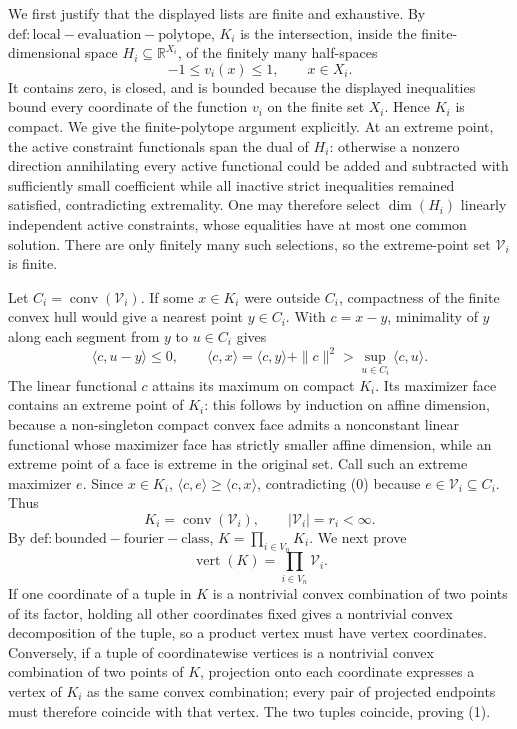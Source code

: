 We first justify that the displayed lists are finite and exhaustive.  By \(\mathrm{def:local-evaluation-polytope}\), \(K_i\) is the intersection, inside the finite-dimensional space \(H_i\subseteq\mathbb R^{X_i}\), of the finitely many half-spaces
\[
 -1\le v_i(x)\le1,
 \qquad x\in X_i.
\]
It contains zero, is closed, and is bounded because the displayed inequalities bound every coordinate of the function \(v_i\) on the finite set \(X_i\).  Hence \(K_i\) is compact.  We give the finite-polytope argument explicitly.  At an extreme point, the active constraint functionals span the dual of \(H_i\): otherwise a nonzero direction annihilating every active functional could be added and subtracted with sufficiently small coefficient while all inactive strict inequalities remained satisfied, contradicting extremality.  One may therefore select \(\dim(H_i)\) linearly independent active constraints, whose equalities have at most one common solution.  There are only finitely many such selections, so the extreme-point set \(\mathcal V_i\) is finite.

Let \(C_i=\operatorname{conv}(\mathcal V_i)\).  If some \(x\in K_i\) were outside \(C_i\), compactness of the finite convex hull would give a nearest point \(y\in C_i\).  With \(c=x-y\), minimality of \(y\) along each segment from \(y\) to \(u\in C_i\) gives
\[
 \langle c,u-y\rangle\le0,
 \qquad
 \langle c,x\rangle=\langle c,y\rangle+\|c\|^2
 >\sup_{u\in C_i}\langle c,u\rangle. \tag{0}
\]
The linear functional \(c\) attains its maximum on compact \(K_i\).  Its maximizer face contains an extreme point of \(K_i\): this follows by induction on affine dimension, because a non-singleton compact convex face admits a nonconstant linear functional whose maximizer face has strictly smaller affine dimension, while an extreme point of a face is extreme in the original set.  Call such an extreme maximizer \(e\).  Since \(x\in K_i\), \(\langle c,e\rangle\ge\langle c,x\rangle\), contradicting (0) because \(e\in\mathcal V_i\subseteq C_i\).  Thus
\[
 K_i=\operatorname{conv}(\mathcal V_i),
 \qquad |\mathcal V_i|=r_i<\infty.
\]
By \(\mathrm{def:bounded-fourier-class}\), \(K=\prod_{i\in V_n}K_i\).  We next prove
\[
 \operatorname{vert}(K)=\prod_{i\in V_n}\mathcal V_i. \tag{1}
\]
If one coordinate of a tuple in \(K\) is a nontrivial convex combination of two points of its factor, holding all other coordinates fixed gives a nontrivial convex decomposition of the tuple, so a product vertex must have vertex coordinates.  Conversely, if a tuple of coordinatewise vertices is a nontrivial convex combination of two points of \(K\), projection onto each coordinate expresses a vertex of \(K_i\) as the same convex combination; every pair of projected endpoints must therefore coincide with that vertex.  The two tuples coincide, proving (1).

